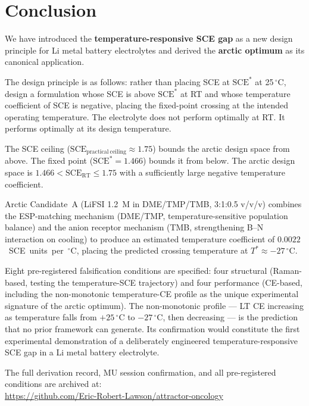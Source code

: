 \documentclass[11pt]{article}
\theoremstyle{plain}
\theoremstyle{definition}
\theoremstyle{remark}
\begin{document}
\section{Conclusion}

We have introduced the \textbf{temperature-responsive SCE gap} as
a new design principle for Li metal battery electrolytes and derived
the \textbf{arctic optimum} as its canonical application.

The design principle is as follows: rather than placing SCE at
$\mathrm{SCE}^{*}$ at 25\,$^\circ$C, design a formulation whose
SCE is above $\mathrm{SCE}^{*}$ at RT and whose temperature
coefficient of SCE is negative, placing the fixed-point crossing
at the intended operating temperature.  The electrolyte does not
perform optimally at RT.  It performs optimally at its design
temperature.

The SCE ceiling ($\mathrm{SCE}_\mathrm{practical~ceiling} \approx 1.75$)
bounds the arctic design space from above.  The fixed point
($\mathrm{SCE}^{*} = 1.466$) bounds it from below.  The arctic
design space is $1.466 < \mathrm{SCE}_\mathrm{RT} \leq 1.75$
with a sufficiently large negative temperature coefficient.

Arctic Candidate~A (LiFSI 1.2~M in DME/TMP/TMB, 3:1:0.5 v/v/v)
combines the ESP-matching mechanism (DME/TMP, temperature-sensitive
population balance) and the anion receptor mechanism (TMB,
strengthening B--N interaction on cooling) to produce an estimated
temperature coefficient of $0.0022$~SCE~units~per~$^\circ$C,
placing the predicted crossing temperature at $T^{*} \approx
-27\,^\circ$C.

Eight pre-registered falsification conditions are specified:
four structural (Raman-based, testing the temperature-SCE trajectory)
and four performance (CE-based, including the non-monotonic
temperature-CE profile as the unique experimental signature of the
arctic optimum).  The non-monotonic profile --- LT CE increasing as
temperature falls from $+25\,^\circ$C to $-27\,^\circ$C,
then decreasing --- is the prediction that no prior framework can
generate.  Its confirmation would constitute the first experimental
demonstration of a deliberately engineered temperature-responsive
SCE gap in a Li metal battery electrolyte.

The full derivation record, MU session confirmation, and all
pre-registered conditions are archived at:\\
\url{https://github.com/Eric-Robert-Lawson/attractor-oncology}
\end{document}
